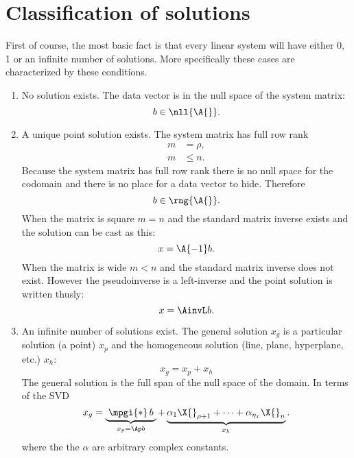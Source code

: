\section{Classification of solutions}
First of course, the most basic fact is that every linear system will have either 0, 1 or an infinite number of solutions. More specifically these cases are characterized by these conditions.
\begin{enumerate}
\item No solution exists. The data vector is in the null space of the system matrix:
\begin{equation}
  b \in \nll{\A{}}.
\end{equation}
\item A unique point solution exists. The system matrix has full row rank
\begin{equation}
  \begin{split}
    m & = \rho,\\
    m & \le n.
  \end{split}
\end{equation}
Because the system matrix has full row rank there is no null space for the codomain and there is no place for a data vector to hide. Therefore
\begin{equation}
  b \in \rng{\A{}}.
\end{equation}
When the matrix is square $m=n$ and the standard matrix inverse exists and the solution can be cast as this:
\begin{equation}
  x=\A{-1}b.
\end{equation}
When the matrix is wide $m<n$ and the standard matrix inverse does not exist. However the pseudoinverse is a left-inverse and the point solution is written thusly:
\begin{equation}
  x=\AinvL b.
\end{equation}
\item An infinite number of solutions exist. The general solution $x_{g}$ is a particular solution (a point) $x_{p}$ and the homogeneous solution (line, plane, hyperplane, etc.) $x_{h}$:
\begin{equation}
  x_{g} = x_{p} + x_{h}
\end{equation}
The general solution is the full span of the null space of the domain. In terms of the SVD 
\begin{equation}
  x_{g} = \underbrace{\phantom{.}\mpgi{*}\, b_{\phantom{.}}}_{x_{p}=\Ap b} + \underbrace{\alpha_{1} \X{}_{\rho+1} + \dots + \alpha_{\eta_{x}} \X{}_{n}}_{x_{h}}.
\end{equation}
where the the $\alpha$ are arbitrary complex constants.
\end{enumerate}

